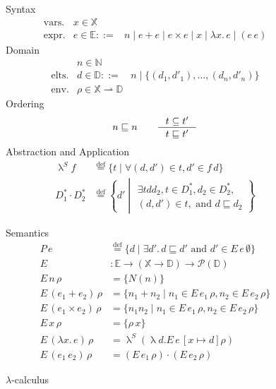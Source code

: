 \documentclass{tufte-handout}
\newcommand{\defeq}[0]{\overset{\mathrm{def}}{=}}
\newcommand{\LAM}[1]{\lambda #1.\,}
\newcommand{\pto}[0]{\rightharpoonup}
\begin{document}
\begin{figure*}
\begin{minipage}{0.5\textwidth}
\noindent Syntax
\[
\begin{array}{lrl}
 \text{vars.} & x \in \mathbb{X}\\
 \text{expr.}& e \in\mathbb{E} ::=& n \mid e + e \mid e \times e \mid x \mid \LAM{x} e \mid (e \, e)
\end{array}
\]
Domain
\[
\begin{array}{lrl}
               & n \in \mathbb{N} \\
  \text{elts.} & d \in \mathbb{D} ::= &n \mid \{ (d_1,d'_1), \ldots, (d_n,d'_n) \} \\
  \text{env.} & \rho \in  \mathbb{X} \pto \mathbb{D} 
\end{array}
\]
Ordering
\[
   n \sqsubseteq n \qquad 
   \inference{t \subseteq t'}{t \sqsubseteq t'}
\]
Abstraction and Application
\begin{align*}
  \uplambda^S f &\defeq
      \{ t \mid \forall (d,d') \in t, d' \in f\, d \} \\[1ex]
  D^{*}_1 \cdot D^{*}_2 & \defeq
    \left\{ d' \middle|
    \begin{array}{l}
      \exists t d d_2, t \in D^{*}_1,  d_2 \in D^{*}_2, \\
      (d,d') \in t, \text{ and } d \sqsubseteq d_2
    \end{array}
    \right\}
\end{align*}
\end{minipage}
\begin{minipage}{0.5\textwidth}
Semantics
\begin{align*}
  P\,e &\defeq \{ d \mid \exists d'.\, d \sqsubseteq d' 
               \text{ and } d' \in E\,e\,\emptyset\} \\[1ex]
  E & : \mathbb{E} \to (\mathbb{X}\to \mathbb{D}) \to \mathcal{P}(\mathbb{D})\\
  E\, n \, \rho & = \{ N(n) \} \\
  E\, (e_1 + e_2) \, \rho & = \{ n_1 + n_2 \mid n_1 \in E\,e_1\,\rho, 
                                    n_2 \in E\,e_2\,\rho \} \\
  E\, (e_1 \times e_2) \, \rho & = \{ n_1 n_2 \mid n_1 \in E\,e_1\,\rho, 
                                    n_2 \in E\,e_2\,\rho \} \\
  E\, x \,\rho &= \{ \rho\,x \} \\
  E\, (\LAM{x}e)\,\rho &= \uplambda^S (\uplambda d. E\,e\,[x\mapsto d]\rho) \\
  E\, (e_1\,e_2)\,\rho &= (E\,e_1\,\rho) \cdot (E\,e_2\,\rho)
\end{align*}
\end{minipage}
\caption{$\lambda$-calculus}
\label{fig:lambda}
\end{figure*}
\end{document}
